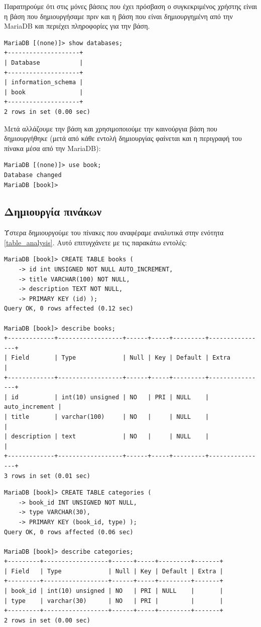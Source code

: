 \documentclass{assignment}
\begin{document}

Παρατηρούμε ότι στις μόνες βάσεις που έχει πρόσβαση ο συγκεκριμένος χρήστης είναι η βάση που δημιουργήσαμε πριν και η βάση που είναι δημιουργημένη από την MariaDB και περιέχει πληροφορίες για την βάση.

\begin{verbatim}
MariaDB [(none)]> show databases;
+--------------------+
| Database           |
+--------------------+
| information_schema |
| book               |
+--------------------+
2 rows in set (0.00 sec)
\end{verbatim}

Μετά αλλάζουμε την βάση και χρησιμοποιούμε την καινούργια βάση που δημιουργήθηκε (μετά από κάθε εντολή δημιουργίας φαίνεται και η περιγραφή του πίνακα μέσα από την MariaDB):

\begin{verbatim}
MariaDB [(none)]> use book;
Database changed
MariaDB [book]> 
\end{verbatim}


\subsection{Δημιουργία πινάκων}

Ύστερα δημιουργούμε του πίνακες που αναφέραμε αναλυτικά στην ενότητα \ref{table_analysis}. Αυτό επιτυγχάνετε με τις παρακάτω εντολές:

\begin{verbatim}
MariaDB [book]> CREATE TABLE books (
    -> id int UNSIGNED NOT NULL AUTO_INCREMENT,
    -> title VARCHAR(100) NOT NULL,
    -> description TEXT NOT NULL,
    -> PRIMARY KEY (id) );
Query OK, 0 rows affected (0.12 sec)

MariaDB [book]> describe books;
+-------------+------------------+------+-----+---------+----------------+
| Field       | Type             | Null | Key | Default | Extra          |
+-------------+------------------+------+-----+---------+----------------+
| id          | int(10) unsigned | NO   | PRI | NULL    | auto_increment |
| title       | varchar(100)     | NO   |     | NULL    |                |
| description | text             | NO   |     | NULL    |                |
+-------------+------------------+------+-----+---------+----------------+
3 rows in set (0.01 sec)
\end{verbatim}

\begin{verbatim}
MariaDB [book]> CREATE TABLE categories (
    -> book_id INT UNSIGNED NOT NULL,
    -> type VARCHAR(30),
    -> PRIMARY KEY (book_id, type) );
Query OK, 0 rows affected (0.06 sec)

MariaDB [book]> describe categories;
+---------+------------------+------+-----+---------+-------+
| Field   | Type             | Null | Key | Default | Extra |
+---------+------------------+------+-----+---------+-------+
| book_id | int(10) unsigned | NO   | PRI | NULL    |       |
| type    | varchar(30)      | NO   | PRI |         |       |
+---------+------------------+------+-----+---------+-------+
2 rows in set (0.00 sec)
\end{verbatim}
\end{document}
